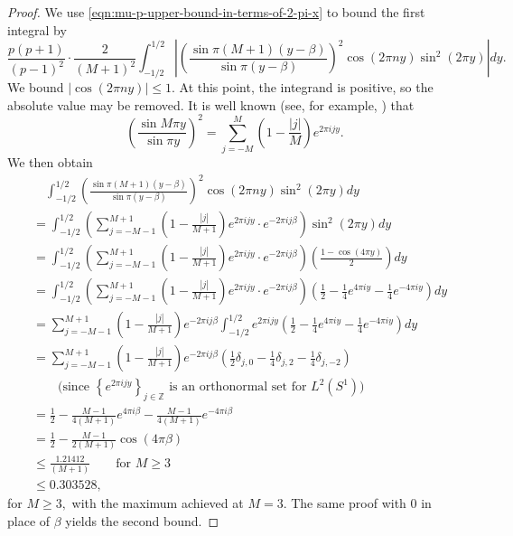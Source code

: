\documentclass[11pt,letterpaper,reqno]{amsart}
\theoremstyle{definition}
\numberwithin{equation}{section}
\numberwithin{figure}{section}
\numberwithin{table}{section}
\begin{document}
\begin{proof}
    We use \eqref{eqn:mu-p-upper-bound-in-terms-of-2-pi-x} to bound the first integral by
    $$\frac{p(p + 1)}{(p - 1)^2} \cdot \frac{2}{(M + 1)^2} \int_{-1/2}^{1/2} \left|\left( \frac{\sin \pi(M + 1)(y - \beta)}{\sin\pi(y - \beta)}  \right)^2  \cos (2\pi n y) \sin^2(2\pi y) \right| dy.$$
    We bound $|\cos (2\pi n y)| \leq 1.$ At this point, the integrand is positive, so the absolute value may be removed. It is well known (see, for example, \cite[Chapter 2, Lemma 5.1]{SS03}) that
    $$\left( \frac{\sin M\pi y}{\sin\pi y}  \right)^2 = \sum_{j = -M}^M \left(1 - \frac{|j|}{M} \right) e^{2\pi ij y}.$$
    We then obtain
    \begin{align}
        &\quad \int_{-1/2}^{1/2} \left( \frac{\sin \pi(M + 1)(y - \beta)}{\sin\pi(y - \beta)}  \right)^2  \cos (2\pi n y) \sin^2(2\pi y)  dy\\
        &= \int_{-1/2}^{1/2} \left( \sum_{j = -M - 1}^{M + 1} \left(1 - \frac{|j|}{M + 1} \right) e^{2\pi i j y} \cdot e^{- 2 \pi i j \beta} \right) \sin^2(2\pi y) dy\\
        &= \int_{-1/2}^{1/2} \left( \sum_{j = -M - 1}^{M + 1} \left(1 - \frac{|j|}{M + 1} \right) e^{2\pi i j y} \cdot e^{-2 \pi i j \beta} \right) \left(\frac{1 - \cos(4\pi y)}{2} \right) dy\\
        &= \int_{-1/2}^{1/2} \left( \sum_{j = -M - 1}^{M + 1} \left(1 - \frac{|j|}{M + 1} \right) e^{2\pi i j y} \cdot e^{-2 \pi i j \beta} \right) \left( \frac{1}{2} - \frac{1}{4} e^{4\pi i y} - \frac{1}{4} e^{-4 \pi i y} \right) dy\\
        &= \sum_{j = -M - 1}^{M + 1} \left(1 - \frac{|j|}{M + 1} \right) 
        e^{-2 \pi i j \beta}
        \int_{-1/2}^{1/2}   e^{2\pi i j y}  \left( \frac{1}{2} - \frac{1}{4} e^{4\pi i y} - \frac{1}{4} e^{-4 \pi i y} \right) dy\\
        &= \sum_{j = -M - 1}^{M + 1} \left(1 - \frac{|j|}{M + 1} \right) 
        e^{-2 \pi i j \beta}
        \left( \frac{1}{2} \delta_{j,0} - \frac{1}{4} \delta_{j,2} - \frac{1}{4} \delta_{j,-2} \right) \\
        & \qquad \text{(since $\left\{ e^{2\pi i j y} \right\}_{j \in \mathbb{Z}}$ is an orthonormal set for $L^2(S^1)$)}\\
        &= \frac{1}{2} - \frac{M - 1}{4(M + 1)} e^{4\pi i \beta}  - \frac{M - 1}{4(M + 1)} e^{-4\pi i \beta}\\
        &= \frac{1}{2} - \frac{M - 1}{2(M + 1)} \cos(4\pi \beta)\\
        &\leq \frac{1.21412}{(M + 1)} \qquad \text{for $M \geq 3$} \label{eqn:obvious-fejer-integral-actually-cubic}\\
        &\leq 0.303528,
    \end{align}
    for $M \geq 3,$ with the maximum achieved at $M = 3.$ The same proof with $0$ in place of $\beta$ yields the second bound.
\end{proof}
\end{document}
